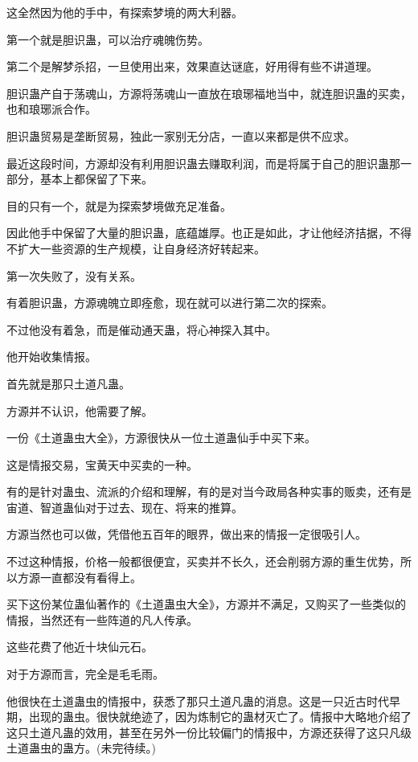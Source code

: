 \begin{this_body}
这全然因为他的手中，有探索梦境的两大利器。

第一个就是胆识蛊，可以治疗魂魄伤势。

第二个是解梦杀招，一旦使用出来，效果直达谜底，好用得有些不讲道理。

胆识蛊产自于荡魂山，方源将荡魂山一直放在琅琊福地当中，就连胆识蛊的买卖，也和琅琊派合作。

胆识蛊贸易是垄断贸易，独此一家别无分店，一直以来都是供不应求。

最近这段时间，方源却没有利用胆识蛊去赚取利润，而是将属于自己的胆识蛊那一部分，基本上都保留了下来。

目的只有一个，就是为探索梦境做充足准备。

因此他手中保留了大量的胆识蛊，底蕴雄厚。也正是如此，才让他经济拮据，不得不扩大一些资源的生产规模，让自身经济好转起来。

第一次失败了，没有关系。

有着胆识蛊，方源魂魄立即痊愈，现在就可以进行第二次的探索。

不过他没有着急，而是催动通天蛊，将心神探入其中。

他开始收集情报。

首先就是那只土道凡蛊。

方源并不认识，他需要了解。

一份《土道蛊虫大全》，方源很快从一位土道蛊仙手中买下来。

这是情报交易，宝黄天中买卖的一种。

有的是针对蛊虫、流派的介绍和理解，有的是对当今政局各种实事的贩卖，还有是宙道、智道蛊仙对于过去、现在、将来的推算。

方源当然也可以做，凭借他五百年的眼界，做出来的情报一定很吸引人。

不过这种情报，价格一般都很便宜，买卖并不长久，还会削弱方源的重生优势，所以方源一直都没有看得上。

买下这份某位蛊仙著作的《土道蛊虫大全》，方源并不满足，又购买了一些类似的情报，当然还有一些阵道的凡人传承。

这些花费了他近十块仙元石。

对于方源而言，完全是毛毛雨。

他很快在土道蛊虫的情报中，获悉了那只土道凡蛊的消息。这是一只近古时代早期，出现的蛊虫。很快就绝迹了，因为炼制它的蛊材灭亡了。情报中大略地介绍了这只土道凡蛊的效用，甚至在另外一份比较偏门的情报中，方源还获得了这只凡级土道蛊虫的蛊方。(未完待续。)

\end{this_body}


